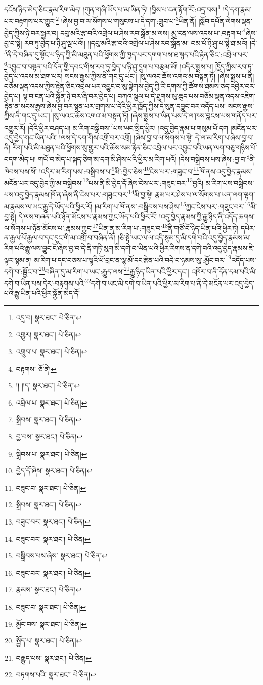 དངོས་ཉིད་མེད་ཅིང་རྣམ་རིག་མེད། །ཀུན་གཞི་ཡོད་པ་མ་ཡིན་ཏེ། །བྱིས་པ་ངན་རྟོག་རོ་:འདྲ་བས།\footnote{འདྲ་བ།  སྣར་ཐང་།  པེ་ཅིན། } །དེ་དག་རྣམ་པར་བརྟགས་པར་གྱུར།\footnote{འགྱུར།  སྣར་ཐང་།  པེ་ཅིན། } །ཞེས་བྱ་བ་ལ་སོགས་པ་གསུངས་པ་དེ་དག་:གྲུབ་པ་\footnote{འགྲུབ་པ་  སྣར་ཐང་།  པེ་ཅིན། }ཡིན་ནོ། །སློབ་དཔོན་ལེགས་ལྡན་བྱེད་ཀྱིས་ཉེ་བར་སྦྱར་བ། དབུ་མའི་རྩ་བའི་འགྲེལ་པ་ཤེས་རབ་སྒྲོན་མ་ལས། མྱ་ངན་ལས་འདས་པ་:བརྟག་པ་\footnote{བརྟགས་  ཅོ་ནེ། }ཞེས་བྱ་བ་སྟེ། རབ་ཏུ་བྱེད་པ་ཉི་ཤུ་ལྔ་པའོ།། །།དབུ་མའི་རྩ་བའི་འགྲེལ་པ་ཤེས་རབ་སྒྲོན་མ། བམ་པོ་ཉི་ཤུ་པ་སྟེ་ཐ་མའོ། །དེ་\footnote{།། །།ད་  སྣར་ཐང་།  པེ་ཅིན། }ནི་དེ་བཞིན་དུ་སྟོང་པ་ཉིད་ཀྱི་མི་མཐུན་པའི་ཕྱོགས་ཀྱི་ཁྱད་པར་དགག་པས་ཐ་སྙད་པའི་རྟེན་ཅིང་:འབྲེལ་པར་\footnote{འབྲེལ་པ་  སྣར་ཐང་།  པེ་ཅིན། }འབྱུང་བ་བསྟན་པའི་དོན་གྱི་དབང་གིས་རབ་ཏུ་བྱེད་པ་ཉི་ཤུ་དྲུག་པ་བརྩམ་མོ། །འདིར་སྨྲས་པ། ཁྱོད་ཀྱིས་རབ་ཏུ་བྱེད་པ་འདས་མ་ཐག་པར། སངས་རྒྱས་ཀྱིས་ནི་གང་དུ་ཡང་། །སུ་ལའང་ཆོས་འགའ་མ་བསྟན་ཏོ། །ཞེས་སྨྲས་པ་ནི། བཅོམ་ལྡན་འདས་ཀྱིས་རྟེན་ཅིང་འབྲེལ་པར་འབྱུང་བ་མུ་སྟེགས་བྱེད་ཀྱི་རི་དགས་ཀྱི་ཚོགས་ཐམས་ཅད་འབྱེར་བར་བྱེད་པ། ལྟ་བ་ངན་པའི་སྐྱོན་ཉེ་བར་ཞི་བར་བྱེད་པ། བཀའ་སྩལ་པ་དེ་ཐུགས་སུ་ཆུད་པས་བཅོམ་ལྡན་འདས་འཇིག་རྟེན་ན་སངས་རྒྱས་ཞེས་བྱ་བར་སྙན་པར་གྲགས་པ་དེའི་ཕྱིར་ཁྱོད་ཀྱིས་དེ་སུན་དབྱུང་བར་འདོད་པས། སངས་རྒྱས་ཀྱིས་ནི་གང་དུ་ཡང་། །སུ་ལའང་ཆོས་འགའ་མ་བསྟན་ཏོ། །ཞེས་སྨྲས་པ་ཡིན་པས་དེ་ལ་ཁས་བླངས་པས་གནོད་པར་འགྱུར་རོ། །དེའི་ཕྱིར་བཤད་པ། མ་རིག་བསྒྲིབས་\footnote{སྒྲིབས་  སྣར་ཐང་།  པེ་ཅིན། }པས་ཡང་སྲིད་ཕྱིར། །འདུ་བྱེད་རྣམ་པ་གསུམ་པོ་དག །མངོན་པར་འདུ་བྱེད་གང་ཡིན་པའི། །ལས་དེ་དག་གིས་འགྲོ་བར་འགྲོ། །ཞེས་བྱ་བ་ལ་སོགས་པ་སྟེ། དེ་ལ་མ་རིག་པ་ཞེས་བྱ་བ་ནི། རིག་པའི་མི་མཐུན་པའི་ཕྱོགས་སུ་གྱུར་པའི་ཆོས་སམ་རྟེན་ཅིང་འབྲེལ་པར་འབྱུང་བའི་ཡན་ལག་བཅུ་གཉིས་པོ་བདག་མེད་པ། གཡོ་བ་མེད་པ་སྐད་ཅིག་མ་དག་མི་ཤེས་པའི་ཕྱིར་མ་རིག་པའོ། །དེས་བསྒྲིབས་པས་ཞེས་:བྱ་བ་\footnote{བྱ་བས་  སྣར་ཐང་།  པེ་ཅིན། }ནི་ཁེབས་པས་སོ། །འདིར་མ་རིག་པས་:བསྒྲིབས་པ་\footnote{སྒྲིབས་པ་  སྣར་ཐང་།  པེ་ཅིན། }མི་:བྱེད་ཅེས་\footnote{བྱེད་དོ་ཞེས་  སྣར་ཐང་།  པེ་ཅིན། }ངེས་པར་:གཟུང་བ་\footnote{བཟུང་བ་  སྣར་ཐང་།  པེ་ཅིན། }ཁོ་ནས་འདུ་བྱེད་རྣམས་མངོན་པར་འདུ་བྱེད་ཀྱི་མ་བསྒྲིབས་\footnote{སྒྲིབས་  སྣར་ཐང་།  པེ་ཅིན། }པས་ནི་མི་བྱེད་དོ་ཞེས་ངེས་པར་:གཟུང་བར་\footnote{བཟུང་བར་  སྣར་ཐང་།  པེ་ཅིན། }བྱའི། མ་རིག་པས་བསྒྲིབས་པས་འདུ་བྱེད་རྣམས་ཁོ་ན་ཞེས་ནི་ངེས་པར་:གཟུང་བར་\footnote{བཟུང་བར་  སྣར་ཐང་།  པེ་ཅིན། }མི་བྱ་སྟེ། རྣམ་པར་ཤེས་པ་ལ་སོགས་པ་ཡན་ལག་ལྷག་མ་རྣམས་ལ་ཡང་རྒྱུ་དེ་ཡོད་པའི་ཕྱིར་རོ། །མ་རིག་པ་ཁོ་ནས་:བསྒྲིབས་པས་ཤེས་\footnote{བསྒྲིབས་པས་ཞེས་  སྣར་ཐང་།  པེ་ཅིན། }ཀྱང་ངེས་པར་:གཟུང་བར་\footnote{བཟུང་བར་  སྣར་ཐང་།  པེ་ཅིན། }མི་བྱ་སྟེ། དེ་ལས་གཞན་པའི་ཉོན་མོངས་པ་རྣམས་ཀྱང་ཡོད་པའི་ཕྱིར་རོ། །འདུ་བྱེད་རྣམས་ཀྱི་རྒྱུ་ཉིད་ནི་འདོད་ཆགས་ལ་སོགས་པ་ཉོན་མོངས་པ་:རྣམས་ཀྱང་\footnote{རྣམས་  སྣར་ཐང་།  པེ་ཅིན། }ཡིན་ན་མ་རིག་པ་:གཟུང་བ་\footnote{བཟུང་བ་  སྣར་ཐང་།  པེ་ཅིན། }ནི་གཙོ་བོ་ཉིད་ཡིན་པའི་ཕྱིར་ཏེ། དཔེར་ན་རྒྱལ་པོ་རྒྱལ་བ་དང་དུང་གི་མ་འགྲོ་བ་བཞིན་ནོ། །ཅི་སྟེ་ཡང་ལ་ལ་འདི་སྙམ་དུ་མི་དགེ་བའི་འདུ་བྱེད་རྣམས་མ་རིག་པའི་རྒྱུ་ལས་བྱུང་ངོ་ཞེས་བྱ་བ་དེ་ནི་གཏི་མུག་མི་དགེ་བ་ཡིན་པའི་ཕྱིར་རིགས་ན་དགེ་བའི་འདུ་བྱེད་རྣམས་ཇི་ལྟར་སྙམ་ན། མ་རིག་པ་དང་བཅས་པ་ལྷའི་ཕོ་བྲང་ན་ལྷ་མོ་དང་རྩེན་པའི་བདེ་བ་ཉམས་སུ་:མྱོང་བར་\footnote{མྱོང་བས་  སྣར་ཐང་།  པེ་ཅིན། }འདོད་པས་དགེ་བ་:སྦྱོང་བ་\footnote{སྤྱོད་པ་  སྣར་ཐང་།  པེ་ཅིན། }བཞིན་དུ་མ་རིག་པ་ཡང་:རྒྱུད་ལས་\footnote{བརྒྱུད་པས་  སྣར་ཐང་།  པེ་ཅིན། }རྒྱུ་ཉིད་ཡིན་པའི་ཕྱིར་དང་། འཁོར་བ་ནི་དོན་དམ་པའི་མི་དགེ་བ་ཡིན་པས་དེར་:བརྟགས་པའི་\footnote{བཏགས་པའི་  སྣར་ཐང་།  པེ་ཅིན། }དགེ་བ་ཡང་མི་དགེ་བ་ཡིན་པའི་ཕྱིར་མ་རིག་པ་ནི་དེ་མངོན་པར་འདུ་བྱེད་པའི་རྒྱུ་ཡིན་པའི་ཕྱིར་སྐྱོན་མེད་དོ། 